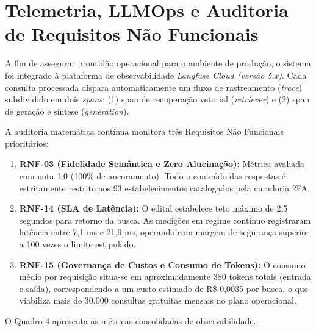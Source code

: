 \documentclass[11pt,a4paper]{article}
\begin{document}
\section{Telemetria, LLMOps e Auditoria de Requisitos Não Funcionais}

A fim de assegurar prontidão operacional para o ambiente de produção, o sistema foi integrado à plataforma de observabilidade \textit{Langfuse Cloud (versão 5.x)}. Cada consulta processada dispara automaticamente um fluxo de rastreamento (\textit{trace}) subdividido em dois \textit{spans}: (1) span de recuperação vetorial (\textit{retriever}) e (2) span de geração e síntese (\textit{generation}).

A auditoria matemática contínua monitora três Requisitos Não Funcionais prioritários:

\begin{enumerate}
\item \textbf{RNF-03 (Fidelidade Semântica e Zero Alucinação):} Métrica avaliada com nota 1.0 (100\% de ancoramento). Todo o conteúdo das respostas é estritamente restrito aos 93 estabelecimentos catalogados pela curadoria 2FA.
\item \textbf{RNF-14 (SLA de Latência):} O edital estabelece teto máximo de 2,5 segundos para retorno da busca. As medições em regime contínuo registraram latência entre 7,1 ms e 21,9 ms, operando com margem de segurança superior a 100 vezes o limite estipulado.
\item \textbf{RNF-15 (Governança de Custos e Consumo de Tokens):} O consumo médio por requisição situa-se em aproximadamente 380 tokens totais (entrada e saída), correspondendo a um custo estimado de R\$ 0,0035 por busca, o que viabiliza mais de 30.000 consultas gratuitas mensais no plano operacional.
\end{enumerate}

O Quadro 4 apresenta as métricas consolidadas de observabilidade.
\end{document}
